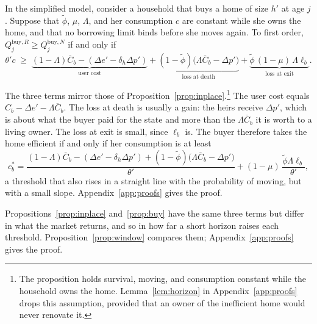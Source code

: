 \begin{proposition}\label{prop:buy}
In the simplified model, consider a household that buys a home of size
$h'$ at age $j$. Suppose that $\tilde\phi$, $\mu$, $\Lambda$, and her
consumption $c$ are constant while she owns the home, and that no borrowing
limit binds before she moves again. To first order,
$Q_j^{\mathrm{buy},R}\ge Q_j^{\mathrm{buy},N}$ if and only if
\begin{equation}
  \theta'c\;\ge\;
  \underbrace{(1-\Lambda)\overline C_b-(\Delta e'-\delta_h\Delta p')}_{\text{user cost}}
  +\underbrace{(1-\tilde\phi)\bigl(\Lambda\overline C_b-\Delta p'\bigr)}_{\text{loss at death}}
  +\underbrace{\tilde\phi\,(1-\mu)\,\Lambda\ell_b}_{\text{loss at exit}}.
  \label{eq:rule-buy}
\end{equation}
\end{proposition}


The three terms mirror those of
Proposition~\ref{prop:inplace}.\footnote{The proposition holds survival,
moving, and consumption constant while the household owns the home.
Lemma~\ref{lem:horizon} in Appendix~\ref{app:proofs} drops this assumption,
provided that an owner of the inefficient home would never renovate it.}
The user cost equals $C_b-\Delta e'-\Lambda\overline C_b$. The loss at death
is usually a gain: the heirs receive $\Delta p'$, which is about what the
buyer paid for the state and more than the $\Lambda\overline C_b$ it is
worth to a living owner. The loss at exit is small, since $\ell_b$ is. The
buyer therefore takes the home efficient if and only if her consumption is
at least
\begin{equation}
  c_b^*=\frac{(1-\Lambda)\overline C_b-(\Delta e'-\delta_h\Delta p')
  +(1-\tilde\phi)\bigl(\Lambda\overline C_b-\Delta p'\bigr)}{\theta'}
  +(1-\mu)\,\frac{\tilde\phi\Lambda\ell_b}{\theta'},
  \label{eq:cstar-buy}
\end{equation}
a threshold that also rises in a straight line with the probability of
moving, but with a small slope. Appendix~\ref{app:proofs} gives the proof.

Propositions~\ref{prop:inplace} and~\ref{prop:buy} have the same three terms but differ in what the
market returns, and so in how far a short horizon raises each threshold.
Proposition~\ref{prop:window} compares them; Appendix~\ref{app:proofs} gives
the proof.

